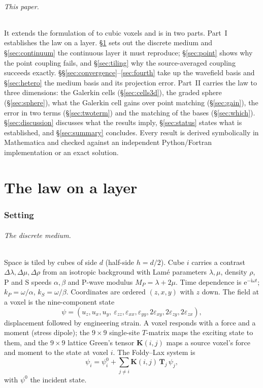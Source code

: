 \documentclass[11pt,a4paper]{article}
\newcommand{\bK}{\mathbf{K}}
\newcommand{\bT}{\mathbf{T}}
\begin{document}
\paragraph{This paper.} It extends the formulation of \citet{Nestor1996} to cubic voxels and is in two
parts. Part~I establishes the law on a layer. \S\ref{sec:setting} sets out the discrete medium and
\S\ref{sec:continuum} the continuous layer it must reproduce; \S\ref{sec:point} shows why the point
coupling fails, and \S\ref{sec:tiling} why the source-averaged coupling succeeds exactly.
\S\S\ref{sec:convergence}--\ref{sec:fourth} take up the wavefield basis and \S\ref{sec:hetero} the medium
basis and its projection error. Part~II carries the law to three dimensions: the Galerkin cells
(\S\ref{sec:cells3d}), the graded sphere (\S\ref{sec:sphere}), what the Galerkin cell gains over point
matching (\S\ref{sec:gain}), the error in two terms
(\S\ref{sec:twoterm}) and the matching of the bases (\S\ref{sec:which}). \S\ref{sec:discussion}
discusses what the results imply, \S\ref{sec:status} states what is established, and
\S\ref{sec:summary} concludes. Every result is derived symbolically in Mathematica and checked against an
independent Python/Fortran implementation or an exact solution.

\part{The law on a layer}

\section{Setting}\label{sec:setting}

\paragraph{The discrete medium.} Space is tiled by cubes of side $d$ (half-side $h=d/2$). Cube $i$
carries a contrast $\Delta\lambda,\Delta\mu,\Delta\rho$ from an isotropic background with Lamé
parameters $\lambda,\mu$, density $\rho$, P and S speeds $\alpha,\beta$ and P-wave modulus
$M_P=\lambda+2\mu$. Time dependence is $\mathrm{e}^{-\mathrm{i}\omega t}$; $k_P=\omega/\alpha$, $k_S=\omega/\beta$.
Coordinates are ordered $(z,x,y)$ with $z$ down. The field at a voxel is the nine-component state
\begin{equation}
  \psi=(u_z,u_x,u_y,\ \varepsilon_{zz},\varepsilon_{xx},\varepsilon_{yy},
  2\varepsilon_{xy},2\varepsilon_{zy},2\varepsilon_{zx}),
\end{equation}
displacement followed by engineering strain. A voxel responds with a force and a moment (stress
dipole); the $9\times9$ single-site $T$-matrix maps the exciting state to them, and the $9\times9$
lattice Green's tensor $\bK(i,j)$ maps a source voxel's force and moment to the state at voxel $i$.
The Foldy--Lax system is
\begin{equation}\label{eq:foldylax}
  \psi_i=\psi^0_i+\sum_{j\neq i}\bK(i,j)\,\bT_j\,\psi_j ,
\end{equation}
with $\psi^0$ the incident state.
\end{document}

